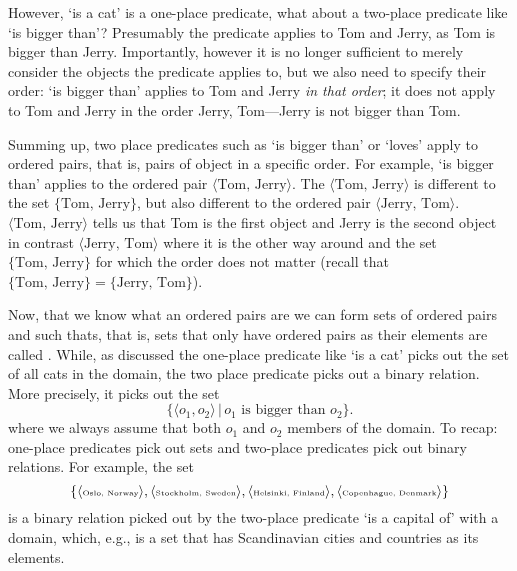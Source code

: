 However, `is a cat' is a one-place predicate, what about a two-place predicate like `is bigger than'?  Presumably the predicate applies to Tom and Jerry, as Tom is bigger than Jerry. Importantly, however it is no longer sufficient to merely consider the objects the predicate applies to, but we also need to specify their order: `is bigger than' applies to Tom and Jerry \emph{in that order}; it does not apply to Tom and Jerry in the order Jerry, Tom---Jerry is not bigger than Tom. 

Summing up, two place predicates such as `is bigger than' or `loves' apply to ordered pairs, that is, pairs of object in a specific order. For example, `is bigger than' applies to the ordered pair $\langle\text{Tom, Jerry}\rangle$. The  $\langle\text{Tom, Jerry}\rangle$ is different to the set $\{\text{Tom, Jerry}\}$, but also different to the ordered pair $\langle\text{Jerry, Tom}\rangle$. $\langle\text{Tom, Jerry}\rangle$ tells us that Tom is the first object and Jerry is the second object in contrast $\langle\text{Jerry, Tom}\rangle$ where it is the other way around and the set $\{\text{Tom, Jerry}\}$ for which the order does not matter (recall that $\{\text{Tom, Jerry}\}=\{\text{Jerry, Tom}\}$). 

Now, that we know what an ordered pairs are we can form sets of ordered pairs and such thats, that is, sets that only have ordered pairs as their elements are called . While, as discussed the one-place predicate like `is a cat' picks out the set of all cats in the domain, the two place predicate picks out a binary relation. More precisely, it picks out the set
$$\{\langle o_1,o_2\rangle\,|\,o_1\text{ is bigger than }o_2\}.$$
where we always assume that both $o_1$ and $o_2$ members of the domain. To recap: one-place predicates pick out sets and two-place predicates pick out binary relations. For example, the set
$${\tiny \{\langle\text{Oslo, Norway}\rangle,\langle\text{Stockholm, Sweden}\rangle,\langle\text{Helsinki, Finland}\rangle,\langle\text{Copenhague, Denmark}\rangle\}}$$
is a binary relation picked out by the two-place predicate `is a capital of' with a domain, which, e.g., is a set that has Scandinavian cities and countries as its elements.


